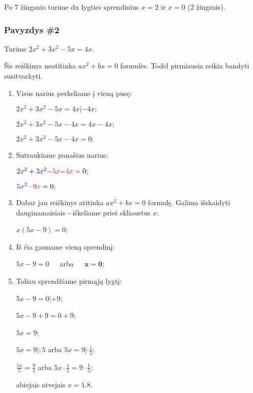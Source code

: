 \documentclass[a4paper]{article}
\begin{document}
Po 7 žingsnio turime du lygties sprendinius $ x = 2 $ ir $ x=0 $ (2 žingsnis).

\subsubsection{Pavyzdys \#2}

Turime $ 2x^2 + 3x^2 - 5x = 4x $.

Šis reiškinys neatitinka $ ax^{2}+ bx = 0 $ formulės. Todėl pirmiausia reikia
bandyti susitvarkyti.

\begin{enumerate}
      \item Visus narius perkeliame į vieną pusę:

            $ 2x^2 + 3x^2 - 5x = 4x | - 4x; $

            $ 2x^2 + 3x^2 - 5x - 4x = 4x - 4x; $

            $ 2x^2 + 3x^2 - 5x - 4x = 0; $

      \item Sutraukiame panašius narius:

            $ \textcolor{blue}{2x^2} + \textcolor{blue}{3x^2} \textcolor{red}{-
                        5x} \textcolor{red}{- 4x} = 0; $

            $ \textcolor{blue}{5x^2} \textcolor{red}{- 9x} = 0; $

      \item Dabar jau reiškinys atitinka $ ax^{2}+ bx = 0 $ formulę. Galima
            išskaidyti dauginamaisiais - iškeliame prieš skliaustus $ x $:

            $ x(5x - 9) = 0 $;

      \item Iš čia gauname vieną sprendinį:

            $ 5x-9 = 0 $ $\;\;\;$ arba $\;\;\;$ $ \boldsymbol{x=0} $;

      \item Toliau sprendžiame pirmąją lygtį:

            $ 5x-9 = 0 | + 9 $;

            $ 5x-9+9 = 0+9 $;

            $ 5x = 9 $;

            $ 5x = 9|:5 $ arba $ 5x = 9|\cdot \frac{1}{5}$;

            $ \frac{5x}{5} = \frac{9}{5} $ arba $ 5x\cdot\frac{1}{5} = 9\cdot
                  \frac{1}{5}$;

            abiejais atvejais $ x = 1.8 $.

\end{enumerate}
\end{document}
